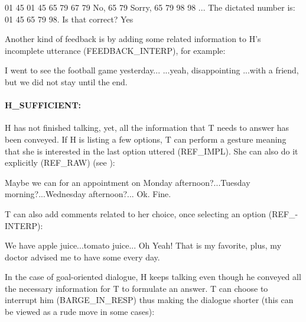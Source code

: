 						\begin{dialogue}
							 01 45
							 01 45
							 65 79
							 67 79
							 No, 65 79
							 Sorry, 65 79
							 98
							 98
							 ...
							 The dictated number is: 01 45 65 79 98. Is that correct?
							 Yes
						\end{dialogue}
						
						Another kind of feedback is by adding some related information to H's incomplete utterance (FEEDBACK\_INTERP), for example:
						
						\begin{dialogue}
							 I went to see the football game yesterday...
							 ...yeah, disappointing
							 ...with a friend, but we did not stay until the end.
						\end{dialogue}
                        
                   	\paragraph{H\_SUFFICIENT:} H has not finished talking, yet, all the information that T needs to answer has been conveyed. If H is listing a few options, T can perform a gesture meaning that she is interested in the last option uttered (REF\_IMPL). She can also do it explicitly (REF\_RAW) (see \cite{El-Asri2014a}):
                    
                    	\begin{dialogue}
							 Maybe we can for an appointment on Monday afternoon?...Tuesday morning?...Wednesday afternoon?...
							\speak{T} Ok. Fine.
						\end{dialogue}
                        
                   	T can also add comments related to her choice, once selecting an option (REF\_-\\INTERP):
                    
                    	\begin{dialogue}
							 We have apple juice...tomato juice...
							 Oh Yeah! That is my favorite, plus, my doctor advised me to have some every day.
						\end{dialogue}
                    
                    In the case of goal-oriented dialogue, H keeps talking even though he conveyed all the necessary information for T to formulate an answer. T can choose to interrupt him (BARGE\_IN\_RESP) thus making the dialogue shorter (this can be viewed as a rude move in some cases):
                    
